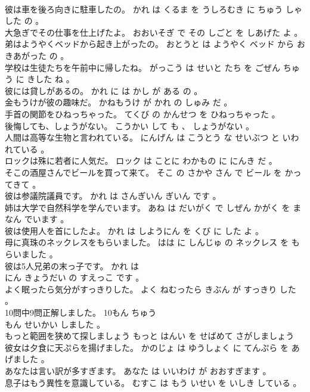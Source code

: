 \documentclass[8pt]{extreport}
\begin{document}
\begin{CJK}{UTF8}{min}
\\	彼は車を後ろ向きに駐車したの。	かれ は くるま を うしろむき に ちゅう しゃ した の 。 
\\	大急ぎでその仕事を仕上げたよ。	おおいそぎ で その しごと を しあげた よ 。 
\\	弟はようやくベッドから起き上がったの。	おとうと は ようやく ベッド から おきあがった の 。 
\\	学校は生徒たちを午前中に帰したね。	がっこう は せいと たち を ごぜん ちゅう に きした ね 。 
\\	彼には貸しがあるの。	かれ に は かし が ある の 。 
\\	金もうけが彼の趣味だ。	かねもうけ が かれ の しゅみ だ 。 
\\	手首の関節をひねっちゃった。	てくび の かんせつ を ひねっちゃった 。 
\\	後悔しても、しょうがない。	こうかい して も 、 しょうがない 。 
\\	人間は高等な生物と言われている。	にんげん は こうとう な せいぶつ と いわれている 。 
\\	ロックは殊に若者に人気だ。	ロック は ことに わかもの に にんき だ 。 
\\	そこの酒屋さんでビールを買って来て。	そこ の さかや さん で ビール を かってきて 。 
\\	彼は参議院議員です。	かれ は さんぎいん ぎいん です 。 
\\	姉は大学で自然科学を学んでいます。	あね は だいがく で しぜん かがく を まなん でいます 。 
\\	彼は使用人を首にしたよ。	かれ は しようにん を くび に した よ 。 
\\	母に真珠のネックレスをもらいました。	はは に しんじゅ の ネックレス を もらいました 。 
\\	彼は5人兄弟の末っ子です。	かれ は 
\\	にん きょうだい の すえっこ です 。 
\\	よく眠ったら気分がすっきりした。	よく ねむったら きぶん が すっきり した 。 
\\	10問中9問正解しました。	10もん ちゅう 
\\	もん せいかい しました 。 
\\	もっと範囲を狭めて探しましょう	もっと はんい を せばめて さがしましょう 
\\	彼女は夕食に天ぷらを揚げました。	かのじょ は ゆうしょく に てんぷら を あげました 。 
\\	あなたは言い訳が多すぎます。	あなた は いいわけ が おおすぎます 。 
\\	息子はもう異性を意識している。	むすこ は もう いせい を いしき している 。 

\end{CJK}
\end{document}
